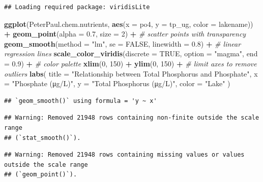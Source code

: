 \documentclass[
]{article}
\newenvironment{Shaded}{\begin{snugshade}}{\end{snugshade}}
\newcommand{\AttributeTok}[1]{\textcolor[rgb]{0.13,0.29,0.53}{#1}}
\newcommand{\CommentTok}[1]{\textcolor[rgb]{0.56,0.35,0.01}{\textit{#1}}}
\newcommand{\ConstantTok}[1]{\textcolor[rgb]{0.56,0.35,0.01}{#1}}
\newcommand{\DecValTok}[1]{\textcolor[rgb]{0.00,0.00,0.81}{#1}}
\newcommand{\FloatTok}[1]{\textcolor[rgb]{0.00,0.00,0.81}{#1}}
\newcommand{\FunctionTok}[1]{\textcolor[rgb]{0.13,0.29,0.53}{\textbf{#1}}}
\newcommand{\NormalTok}[1]{#1}
\newcommand{\SpecialCharTok}[1]{\textcolor[rgb]{0.81,0.36,0.00}{\textbf{#1}}}
\newcommand{\StringTok}[1]{\textcolor[rgb]{0.31,0.60,0.02}{#1}}
\begin{document}
\begin{verbatim}
## Loading required package: viridisLite
\end{verbatim}

\begin{Shaded}
\begin{Highlighting}[]
\FunctionTok{ggplot}\NormalTok{(PeterPaul.chem.nutrients, }
       \FunctionTok{aes}\NormalTok{(}\AttributeTok{x =}\NormalTok{ po4, }\AttributeTok{y =}\NormalTok{ tp\_ug, }\AttributeTok{color =}\NormalTok{ lakename)) }\SpecialCharTok{+}
  \FunctionTok{geom\_point}\NormalTok{(}\AttributeTok{alpha =} \FloatTok{0.7}\NormalTok{, }\AttributeTok{size =} \DecValTok{2}\NormalTok{) }\SpecialCharTok{+} \CommentTok{\# scatter points with transparency}
  \FunctionTok{geom\_smooth}\NormalTok{(}\AttributeTok{method =} \StringTok{"lm"}\NormalTok{, }\AttributeTok{se =} \ConstantTok{FALSE}\NormalTok{, }\AttributeTok{linewidth =} \FloatTok{0.8}\NormalTok{) }\SpecialCharTok{+} \CommentTok{\# linear regression lines}
  \FunctionTok{scale\_color\_viridis}\NormalTok{(}\AttributeTok{discrete =} \ConstantTok{TRUE}\NormalTok{, }\AttributeTok{option =} \StringTok{"magma"}\NormalTok{, }\AttributeTok{end =} \FloatTok{0.9}\NormalTok{) }\SpecialCharTok{+} \CommentTok{\# color palette}
  \FunctionTok{xlim}\NormalTok{(}\DecValTok{0}\NormalTok{, }\DecValTok{150}\NormalTok{) }\SpecialCharTok{+} \FunctionTok{ylim}\NormalTok{(}\DecValTok{0}\NormalTok{, }\DecValTok{150}\NormalTok{) }\SpecialCharTok{+} \CommentTok{\# limit axes to remove outliers}
  \FunctionTok{labs}\NormalTok{(}
    \AttributeTok{title =} \StringTok{"Relationship between Total Phosphorus and Phosphate"}\NormalTok{,}
    \AttributeTok{x =} \StringTok{"Phosphate (μg/L)"}\NormalTok{,}
    \AttributeTok{y =} \StringTok{"Total Phosphorus (μg/L)"}\NormalTok{,}
    \AttributeTok{color =} \StringTok{"Lake"}
\NormalTok{  )}
\end{Highlighting}
\end{Shaded}

\begin{verbatim}
## `geom_smooth()` using formula = 'y ~ x'
\end{verbatim}

\begin{verbatim}
## Warning: Removed 21948 rows containing non-finite outside the scale range
## (`stat_smooth()`).
\end{verbatim}

\begin{verbatim}
## Warning: Removed 21948 rows containing missing values or values outside the scale range
## (`geom_point()`).
\end{verbatim}
\end{document}

